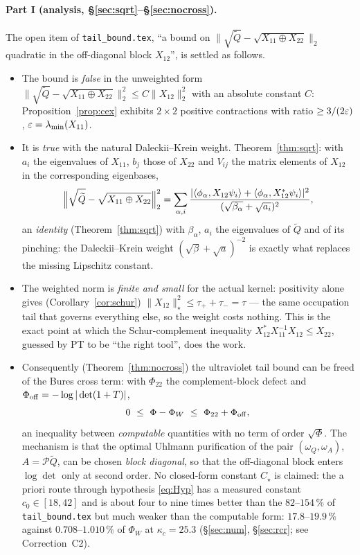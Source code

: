 \documentclass[11pt]{article}
\newcommand{\Nst}[1]{\lVert #1\rVert_{\star}}\newcommand{\Nsto}[1]{\lVert #1\rVert_{\star\star}}\newcommand{\Pinch}{\mathcal P}
\begin{document}
\paragraph{Part I (analysis, \S\ref{sec:sqrt}--\S\ref{sec:nocross}).}  The open item of
\texttt{tail\_bound.tex}, ``a bound on $\|\sqrt{\widetilde Q}-\sqrt{X_{11}\oplus X_{22}}\|_2$
quadratic in the off-diagonal block $X_{12}$'', is settled as follows.
\begin{itemize}[leftmargin=1.6em]
\item The bound is \emph{false} in the unweighted form $\|\sqrt{\widetilde Q}-\sqrt{X_{11}\oplus X_{22}}\|_2^2
 \le C\|X_{12}\|_2^2$ with an absolute constant $C$: Proposition~\ref{prop:cex} exhibits
 $2\times2$ positive contractions with ratio $\ge3/(2\varepsilon)$, $\varepsilon=\lambda_{\min}(X_{11})$.
\item It is \emph{true} with the natural Daleckii--Krein weight.  Theorem~\ref{thm:sqrt}:
 with $a_i$ the eigenvalues of $X_{11}$, $b_j$ those of $X_{22}$ and $V_{ij}$ the matrix elements of
 $X_{12}$ in the corresponding eigenbases,
 \[
  \Bigl\|\sqrt{\widetilde Q}-\sqrt{X_{11}\oplus X_{22}}\Bigr\|_2^2
  =\sum_{\alpha,i}\frac{|\langle\phi_\alpha,X_{12}\psi_i\rangle+\langle\phi_\alpha,X_{12}^*\psi_i\rangle|^2}
  {(\sqrt{\beta_\alpha}+\sqrt{a_i})^{2}},
 \]
 an \emph{identity} (Theorem~\ref{thm:sqrt}) with $\beta_\alpha$, $a_i$ the eigenvalues of
 $\widetilde Q$ and of its pinching: the Daleckii--Krein weight $(\sqrt{\beta}+\sqrt a)^{-2}$ is
 exactly what replaces the missing Lipschitz constant.
\item The weighted norm is \emph{finite and small} for the actual kernel: positivity alone gives
 (Corollary~\ref{cor:schur}) $\Nst{X_{12}}^2\le\tau_++\tau_-=\tau$ --- the same occupation tail that
 governs everything else, so the weight costs nothing.  This is the exact point at which the
 Schur-complement inequality $X_{12}^*X_{11}^{-1}X_{12}\le X_{22}$, guessed by PT to be ``the right
 tool'', does the work.
\item Consequently (Theorem~\ref{thm:nocross}) the ultraviolet tail bound can be freed of the Bures
 cross term: with $\Phi_{22}$ the complement-block defect and $\Phi_{\rm off}=-\log|\det(1+T)|$,
 \[
  0\ \le\ \Phi-\Phi_W\ \le\ \Phi_{22}+\Phi_{\rm off},
 \]
 an inequality between \emph{computable} quantities with no term of order $\sqrt\Phi$.  The
 mechanism is that the optimal Uhlmann purification of the pair $(\omega_Q,\omega_A)$,
 $A=\Pinch\widetilde Q$, can be chosen \emph{block diagonal}, so that the off-diagonal block enters
 $\log\det$ only at second order.  No closed-form constant $C_\star$ is claimed: the a priori route
 through hypothesis \eqref{eq:Hyp} has a measured constant $c_0\in[18,42]$ and is about four to nine times better than the $82$--$154\,\%$ of \texttt{tail\_bound.tex} but
 much weaker than the computable form: $17.8$--$19.9\,\%$ against $0.708$--$1.010\,\%$ of $\Phi_W$ at $\kappa_c=25.3$ (\S\ref{sec:num}, \S\ref{sec:rcr}; see Correction~C2).
\end{itemize}
\end{document}
